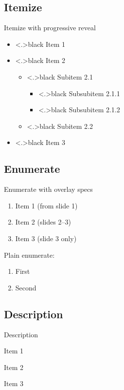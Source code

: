 \documentclass[aspectratio=169]{beamer}
\begin{document}
\subsection{Itemize}
\begin{frame}{Itemize with progressive reveal}
    \begin{itemize}[<+->]\color{gray}
        \item \color<.>{black} Item 1
        \item \color<.>{black} Item 2
        \begin{itemize}[<+->]\color{gray}
            \item \color<.>{black} Subitem 2.1
            \begin{itemize}[<+->]\color{gray}
                \item \color<.>{black} Subsubitem 2.1.1
                \item \color<.>{black} Subsubitem 2.1.2
            \end{itemize}
            \item \color<.>{black} Subitem 2.2
        \end{itemize}
        \item \color<.>{black} Item 3
    \end{itemize}
\end{frame}

\subsection{Enumerate}
\begin{frame}{Enumerate with overlay specs}
    \begin{enumerate}
        \item<1->      Item 1 (from slide 1)
        \item<2-3>     Item 2 (slides 2--3)
        \item<3>       Item 3 (slide 3 only)
    \end{enumerate}

    \medskip
    Plain enumerate:
    \begin{enumerate}
        \item First
        \item Second
    \end{enumerate}
\end{frame}

\subsection{Description}
\begin{frame}{Description}
    \begin{description}
        \item<1> [One] Item 1
        \item<2> [Two] Item 2
        \item<3-> [Three] Item 3
    \end{description}
\end{frame}
\end{document}
